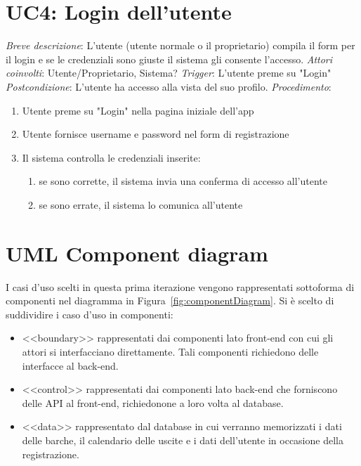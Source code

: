 \section{UC4: Login dell'utente}
\noindent \emph{Breve descrizione}: L'utente (utente normale o il proprietario) compila il form per il login e se le credenziali sono giuste il sistema gli consente l'accesso.\medbreak
\noindent \emph{Attori coinvolti}: Utente/Proprietario, Sistema?\medbreak
\noindent \emph{Trigger}: L'utente preme su "Login"\medbreak
\noindent \emph{Postcondizione}: L'utente ha accesso alla vista del suo profilo.\medbreak
\noindent \emph{Procedimento}:
\begin{enumerate}
    \item Utente preme su "Login" nella pagina iniziale dell'app
    \item Utente fornisce username e password nel form di registrazione
    \item Il sistema controlla le credenziali inserite:
          \begin{enumerate}
              \item se sono corrette, il sistema invia una conferma di accesso all'utente
              \item se sono errate, il sistema lo comunica all'utente
          \end{enumerate}
\end{enumerate}

\newpage

\section{UML Component diagram}
I casi d'uso scelti in questa prima iterazione vengono rappresentati sottoforma di componenti nel diagramma in Figura~\ref{fig:componentDiagram}.
Si è scelto di suddividire i caso d'uso in componenti:

\begin{itemize}
    \item <<boundary>> rappresentati dai componenti lato front-end con cui gli attori si interfacciano direttamente. Tali componenti richiedono delle interfacce al back-end.
    \item <<control>> rappresentati dai componenti lato back-end che forniscono delle API al front-end, richiedonone a loro volta al database.
    \item <<data>> rappresentato dal database in cui verranno memorizzati i dati delle barche, il calendario delle uscite e i dati dell'utente in occasione della registrazione.
\end{itemize}

